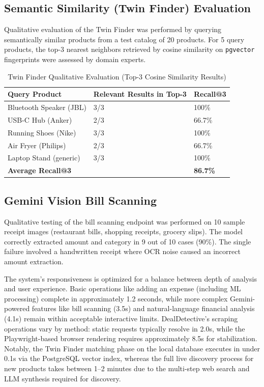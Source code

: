 \documentclass[]{IEEEtran}
\begin{document}
\subsection{Semantic Similarity (Twin Finder) Evaluation}

Qualitative evaluation of the Twin Finder was performed by querying semantically similar products from a test catalog of 20 products. For 5 query products, the top-3 nearest neighbors retrieved by cosine similarity on \texttt{pgvector} fingerprints were assessed by domain experts.

\begin{table}[H]
\caption{Twin Finder Qualitative Evaluation (Top-3 Cosine Similarity Results)}
\label{tab:twin_eval}
\begin{tabularx}{\columnwidth}{@{}lXX@{}}
\toprule
\textbf{Query Product} & \textbf{Relevant Results in Top-3} & \textbf{Recall@3} \\
\midrule
Bluetooth Speaker (JBL) & 3/3 & 100\% \\
USB-C Hub (Anker) & 2/3 & 66.7\% \\
Running Shoes (Nike) & 3/3 & 100\% \\
Air Fryer (Philips) & 2/3 & 66.7\% \\
Laptop Stand (generic) & 3/3 & 100\% \\
\midrule
\textbf{Average Recall@3} & & \textbf{86.7\%} \\
\bottomrule
\end{tabularx}
\end{table}

\subsection{Gemini Vision Bill Scanning}

Qualitative testing of the bill scanning endpoint was performed on 10 sample receipt images (restaurant bills, shopping receipts, grocery slips). The model correctly extracted amount and category in 9 out of 10 cases (90\%). The single failure involved a handwritten receipt where OCR noise caused an incorrect amount extraction.

The system's responsiveness is optimized for a balance between depth of analysis and user experience. Basic operations like adding an expense (including ML processing) complete in approximately 1.2 seconds, while more complex Gemini-powered features like bill scanning (3.5s) and natural-language financial analysis (4.1s) remain within acceptable interactive limits. DealDetective's scraping operations vary by method: static requests typically resolve in 2.0s, while the Playwright-based browser rendering requires approximately 8.5s for stabilization. Notably, the Twin Finder matching phase on the local database executes in under 0.1s via the PostgreSQL vector index, whereas the full live discovery process for new products takes between 1--2 minutes due to the multi-step web search and LLM synthesis required for discovery.
\end{document}

